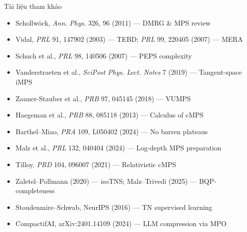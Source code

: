 \documentclass[aspectratio=169, 11pt]{beamer}
\begin{document}
\begin{frame}{Tài liệu tham khảo}
\begin{itemize}
  \item Schollwöck, \textit{Ann. Phys.} 326, 96 (2011) — DMRG \& MPS review
  \item Vidal, \textit{PRL} 91, 147902 (2003) — TEBD; \textit{PRL} 99, 220405 (2007) — MERA
  \item Schuch et al., \textit{PRL} 98, 140506 (2007) — PEPS complexity
  \item Vanderstraeten et al., \textit{SciPost Phys. Lect. Notes} 7 (2019) — Tangent-space iMPS
  \item Zauner-Stauber et al., \textit{PRB} 97, 045145 (2018) — VUMPS
  \item Haegeman et al., \textit{PRB} 88, 085118 (2013) — Calculus of cMPS
  \item Barthel--Miao, \textit{PRA} 109, L050402 (2024) — No barren plateaus
  \item Malz et al., \textit{PRL} 132, 040404 (2024) — Log-depth MPS preparation
  \item Tilloy, \textit{PRD} 104, 096007 (2021) — Relativistic cMPS
  \item Zaletel--Pollmann (2020) — isoTNS; Malz--Trivedi (2025) — BQP-completeness
  \item Stoudenmire--Schwab, NeurIPS (2016) — TN supervised learning
  \item CompactifAI, arXiv:2401.14109 (2024) — LLM compression via MPO
\end{itemize}
\end{frame}
\end{document}
